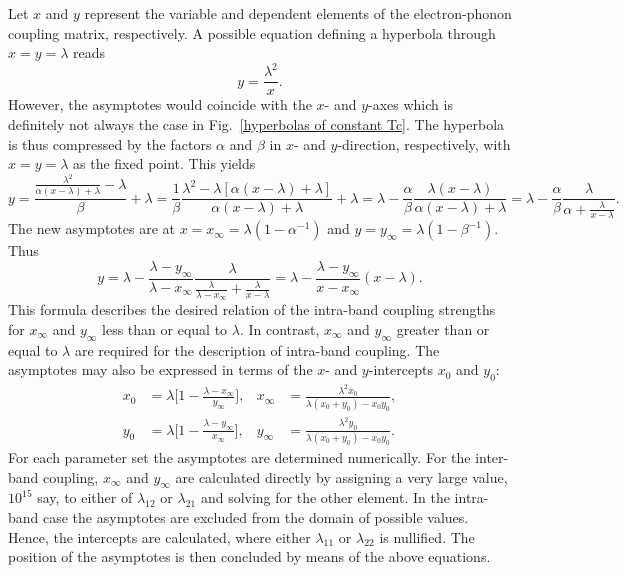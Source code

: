 Let $x$ and $y$ represent the variable and dependent elements of the
electron-phonon coupling matrix, respectively. A possible equation defining a
hyperbola through $x = y = \lambda$ reads
%
\begin{equation*}
    y = \frac {\lambda^2} x.
\end{equation*}
%
However, the asymptotes would coincide with the $x$- and $y$-axes which is
definitely not always the case in Fig.~\ref{hyperbolas of constant Tc}. The
hyperbola is thus compressed by the factors $\alpha$ and $\beta$ in $x$- and
$y$-direction, respectively, with $x = y = \lambda$ as the fixed point. This
yields
%
\begin{equation*}
    y = \frac
        {\frac{\lambda^2} {\alpha (x - \lambda) + \lambda} - \lambda}
        \beta
    + \lambda
    = \frac 1 \beta \frac
        {\lambda^2 - \lambda [\alpha (x - \lambda) + \lambda]}
        {\alpha (x - \lambda) + \lambda}
    + \lambda
    = \lambda - \frac \alpha \beta \frac
        {\lambda (x - \lambda)}
        {\alpha (x - \lambda) + \lambda}
    = \lambda - \frac \alpha \beta \frac
        \lambda
        {\alpha + \frac \lambda {x - \lambda}}.
\end{equation*}
%
The new asymptotes are at $x = x_\infty = \lambda (1 - \alpha^{-1})$ and $y =
y_\infty = \lambda (1 - \beta^{-1})$. Thus
%
\begin{equation*}
    y = \lambda - \frac{\lambda - y_\infty}{\lambda - x_\infty} \frac
        \lambda
        {\frac \lambda {\lambda - x_\infty} + \frac \lambda {x - \lambda}}
    = \lambda - \frac{\lambda - y_\infty}{x - x_\infty} (x - \lambda).
\end{equation*}
%
This formula describes the desired relation of the intra-band coupling strengths
for $x_\infty$ and $y_\infty$ less than or equal to $\lambda$. In contrast,
$x_\infty$ and $y_\infty$ greater than or equal to $\lambda$ are required for
the description of intra-band coupling. The asymptotes may also be expressed in
terms of the $x$- and $y$-intercepts $x_0$ and $y_0$:
%
\begin{align*}
    x_0 &= \lambda \Big[ 1 - \frac{\lambda - x_\infty}{y_\infty} \Big], &
    x_\infty &= \frac{\lambda^2 x_0}{\lambda (x_0 + y_0) - x_0 y_0}, \\
    y_0 &= \lambda \Big[ 1 - \frac{\lambda - y_\infty}{x_\infty} \Big], &
    y_\infty &= \frac{\lambda^2 y_0}{\lambda (x_0 + y_0) - x_0 y_0}.
\end{align*}
%
For each parameter set the asymptotes are determined numerically. For the
inter-band coupling, $x_\infty$ and $y_\infty$ are calculated directly by
assigning a very large value, $10^{15}$ say, to either of $\lambda_{1 2}$ or
$\lambda_{2 1}$ and solving for the other element. In the intra-band case the
asymptotes are excluded from the domain of possible values. Hence, the
intercepts are calculated, where either $\lambda_{1 1}$ or $\lambda_{2 2}$ is
nullified. The position of the asymptotes is then concluded by means of the
above equations.

